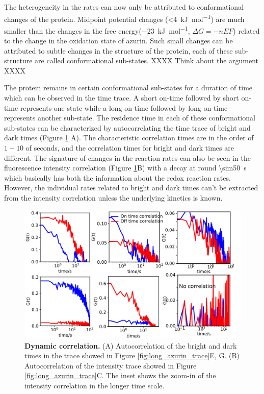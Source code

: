 \documentclass[journal=jacsat,manuscript=article]{achemso}
\begin{document}
The heterogeneity in the rates can now only be attributed to conformational changes of the protein.
Midpoint potential changes (\SI{<4}{\kJ\per\mole}) are much smaller than the changes in the free energy(\SI{-23}{\kJ\per\mole}, $\Delta{G}=-nEF$) related to the change in the oxidation state of azurin. Such small changes can be attributed to subtle changes in the structure of the protein, each of these sub-structure are called conformational sub-states. XXXX Think about the argument XXXX

The protein remains in certain conformational sub-states for a duration of time which can be observed in the time trace.
A short on-time followed by short on-time represents one state while a long on-time followed by long on-time represents another sub-state.
The residence time in each of these conformational sub-states can be characterized by autocorrelating the time trace of bright and dark times (Figure \ref{fig:Dynamic_corr} A).
The characteristic correlation times are in the order of $1-10$ of seconds, and the correlation times for bright and dark times are different.
The signature of changes in the reaction rates can also be seen in the fluorescence intensity correlation (Figure \ref{fig:Dynamic_corr}B) with a decay at round \SI{\sim50}{\s} which basically has both the information about the redox reaction rates.
However, the individual rates related to bright and dark times can't be extracted from the intensity correlation unless the underlying kinetics is known.
\begin{figure}
	\centering
	\includegraphics[width=\textwidth]{Dynamic_corr}
	\caption{\textbf{Dynamic correlation.} (A) Autocorrelation of the bright and dark times in the trace showed in Figure \ref{fig:long_azurin_trace}E, G. (B) Autocorrelation of the intensity trace showed in Figure \ref{fig:long_azurin_trace}C. The inset shows the zoom-in of the intensity correlation in the longer time scale.}
	\label{fig:Dynamic_corr}
\end{figure}
\end{document}
